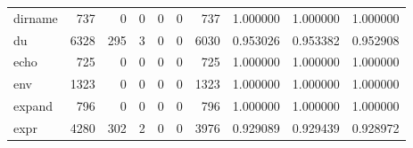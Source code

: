 \begin{tabular}{lrrrrrrrrr}
dirname   &                                                737 &                                                  0 &                                                  0 &                                                  0 &                                                  0 &                                                737 &                                           1.000000 &                               1.000000 &                             1.000000 \\
du        &                                               6328 &                                                295 &                                                  3 &                                                  0 &                                                  0 &                                               6030 &                                           0.953026 &                               0.953382 &                             0.952908 \\
echo      &                                                725 &                                                  0 &                                                  0 &                                                  0 &                                                  0 &                                                725 &                                           1.000000 &                               1.000000 &                             1.000000 \\
env       &                                               1323 &                                                  0 &                                                  0 &                                                  0 &                                                  0 &                                               1323 &                                           1.000000 &                               1.000000 &                             1.000000 \\
expand    &                                                796 &                                                  0 &                                                  0 &                                                  0 &                                                  0 &                                                796 &                                           1.000000 &                               1.000000 &                             1.000000 \\
expr      &                                               4280 &                                                302 &                                                  2 &                                                  0 &                                                  0 &                                               3976 &                                           0.929089 &                               0.929439 &                             0.928972 \\

\end{tabular}

